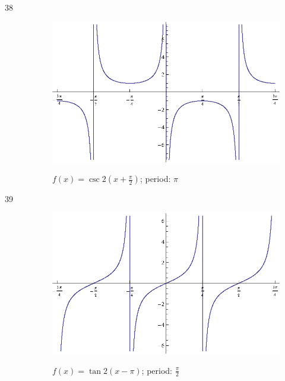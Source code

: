 \documentclass{exam}
\begin{document}
\begin{description}
      \item[38]
        \begin{figure}[H]
          \centering
          \includegraphics[scale=0.9]{exercise38.eps}

          $f(x) = \csc 2 \left( x + \frac{\pi}{2} \right) $; period: $\pi$
        \end{figure}

      \item[39]
        \begin{figure}[H]
          \centering
          \includegraphics[scale=0.9]{exercise39.eps}

          $f(x) = \tan 2 (x - \pi) $; period: $\frac{\pi}{2}$
        \end{figure}


\end{description}
\end{document}
